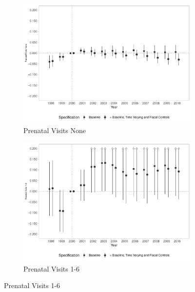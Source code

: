 \begin{figure}[h!]
    \begin{center}
    \caption{Effects on Access to Health Services}\label{fig:14}
    \begin{subfigure}{0.32\textwidth}
        \caption{\scriptsize Prenatal Visits None}\label{fig:14a}
        \centering
        \includegraphics[width=\textwidth]{plots/birth_prenat_0_dist_ec29_baseline_dist_ec29_baseline_14.pdf}
    \end{subfigure}
    \begin{subfigure}{0.32\textwidth}
        \centering
        \caption{\scriptsize Prenatal Visits 1-6}\label{fig:14b}
        \includegraphics[width=\textwidth]{plots/birth_prenat_1_6_dist_ec29_baseline_dist_ec29_baseline_14.pdf}
    \end{subfigure}

\end{center}
\end{figure}

